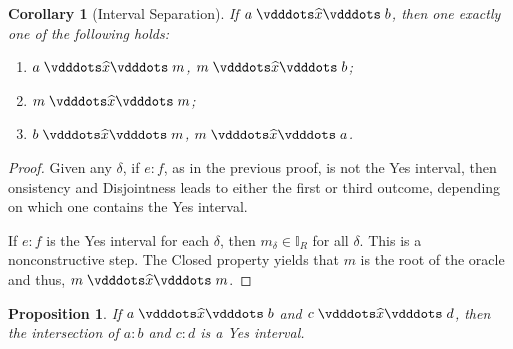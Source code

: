 \documentclass[12pt]{article}
\newtheorem{corollary}{Corollary}[section]
\newtheorem{proposition}{Proposition}[section]
\begin{document}
\begin{corollary}[Interval Separation]
  If $a \xora b$, then one exactly one of the following holds: 
  \begin{enumerate}
        \item $a\xora m$, \sout{$m \xora b$};
        \item $m \xora m$; 
        \item $b \xora m$, \sout{$m \xora a$}.
    \end{enumerate}
\end{corollary}

\begin{proof}
Given any $\delta$, if $e:f$, as in the previous proof, is not the Yes interval, then onsistency and Disjointness leads to either the first or third outcome, depending on which one contains the Yes interval. 

If $e:f$ is the Yes interval for each $\delta$, then $m_\delta \in \mathbb{I}_R$ for all $\delta$. This is a nonconstructive step. The Closed property yields that $m$ is the root of the oracle and thus, $m \xora m$.
\end{proof}

    
\begin{proposition}
    If $ a\xora b$ and $c \xora d$, then the intersection of $a:b$ and $c:d$ is a Yes interval. 
\end{proposition}
\end{document}
